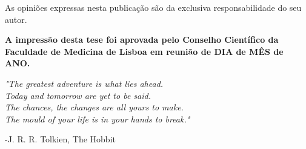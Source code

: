 \documentclass[12pt,a4paper,twoside,openright]{book}
\def\blankpage{%
      \clearpage%
      \thispagestyle{empty}%
      \null%
      \clearpage}
\begin{document}
\begin{sloppy}
\frontmatter


\clearpage \thispagestyle{empty}\mbox{}\clearpage


\clearpage \thispagestyle{empty}\mbox{}\clearpage

\newpage
\thispagestyle{empty}
\vspace*{\fill}
\begin{center}
    \vspace*{\fill}
    As opiniões expressas nesta publicação são
    da exclusiva responsabilidade do seu autor. \\
    
    \vspace*{2cm}
    
    \begingroup
        \fontsize{14pt}{12pt}\selectfont
        \textbf{A impressão desta tese foi aprovada pelo Conselho Científico da Faculdade de Medicina de Lisboa em reunião de DIA de MÊS de ANO.}
    \endgroup
\end{center}
\blankpage

\newpage
\thispagestyle{empty}
\vspace*{3cm}
\begin{center}
\emph{"The greatest adventure is what lies ahead.\\
Today and tomorrow are yet to be said.\\
The chances, the changes are all yours to make.\\
The mould of your life is in your hands to break."} \\
\end{center} 
\begin{flushright}-J. R. R. Tolkien, The Hobbit\end{flushright}
\clearpage \thispagestyle{empty}\mbox{}\clearpage


\newpage
\thispagestyle{plain}

\end{sloppy}
\end{document}
